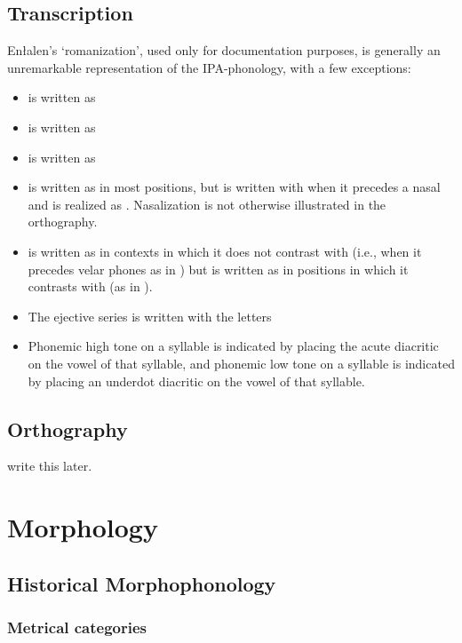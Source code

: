 \section{Transcription}

Enłalen's `romanization', used only for documentation purposes, is generally an unremarkable representation of the IPA-phonology, with a few exceptions:
\begin{itemize}
    \item {} is written as 
    \item \phipa{\pharox\dwnwrd} is written as 
    \item \phipa{\vell} is written as 
    \item {} is written as  in most positions, but is written with  when it precedes a nasal and is realized as . Nasalization is not otherwise illustrated in the orthography.
    \item \phipa{\engma} is written as  in contexts in which it does not contrast with  (i.e., when it precedes velar phones as in  ) but is written as \ortho{\engga} in positions in which it contrasts with  (as in  ).
    \item The ejective series  is written with the letters \ortho{\ppa{} \tta{} \kka{}}
    \item Phonemic high tone on a syllable is indicated by placing the acute diacritic on the vowel of that syllable, and phonemic low tone on a syllable is indicated by placing an underdot diacritic on the vowel of that syllable.
\end{itemize}

\section{Orthography}

write this later.


\chapter{Morphology}

\section{Historical Morphophonology}

\subsection{Metrical categories}

